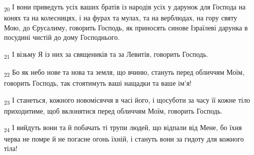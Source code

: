 \begin{tcolorbox}
\textsubscript{20} І вони приведуть усіх ваших братів із народів усіх у дарунок для Господа на конях та на колесницях, і на фурах та мулах, та на верблюдах, на гору святу Мою, до Єрусалиму, говорить Господь, як приносять синове Ізраїлеві дарунка в посудині чистій до дому Господнього.
\end{tcolorbox}
\begin{tcolorbox}
\textsubscript{21} І візьму Я із них за священиків та за Левитів, говорить Господь.
\end{tcolorbox}
\begin{tcolorbox}
\textsubscript{22} Бо як небо нове та нова та земля, що вчиню, стануть перед обличчям Моїм, говорить Господь, так стоятимуть ваші нащадки та ваше ім'я!
\end{tcolorbox}
\begin{tcolorbox}
\textsubscript{23} І станеться, кожного новомісяччя в часі його, і щосуботи за часу її кожне тіло приходитиме, щоб вклонятися перед обличчям Моїм, говорить Господь.
\end{tcolorbox}
\begin{tcolorbox}
\textsubscript{24} І вийдуть вони та й побачать ті трупи людей, що відпали від Мене, бо їхня черва не помре й не погасне огонь їхній, і стануть вони за гидоту для кожного тіла!
\end{tcolorbox}
